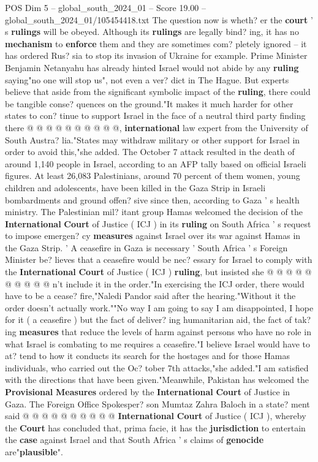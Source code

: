 \begin{textsample}{POS Dim 5 – global\_south\_2024\_01 – Score 19.00 – global\_south\_2024\_01/105454418.txt}
The question now is wheth? er the \textbf{court} ' s \textbf{rulings} will be obeyed.
Although its \textbf{rulings} are legally bind? ing, it has no \textbf{mechanism} to \textbf{enforce} them and they are sometimes com? pletely ignored -- it has ordered Rus? sia to stop its invasion of Ukraine for example.
Prime Minister Benjamin Netanyahu has already hinted Israel would not abide by any \textbf{ruling} saying"no one will stop us", not even a ver? dict in The Hague.
But experts believe that aside from the significant symbolic impact of the \textbf{ruling}, there could be tangible conse? quences on the ground."It makes it much harder for other states to con? tinue to support Israel in the face of a neutral third party finding there @ @ @ @ @ @ @ @ @ @, \textbf{international} law expert from the University of South Austra? lia."States may withdraw military or other support for Israel in order to avoid this,"she added.
The October 7 attack resulted in the death of around 1,140 people in Israel, according to an AFP tally based on official Israeli figures.
At least 26,083 Palestinians, around 70 percent of them women, young children and adolescents, have been killed in the Gaza Strip in Israeli bombardments and ground offen? sive since then, according to Gaza ' s health ministry.
The Palestinian mil? itant group Hamas welcomed the decision of the \textbf{International} \textbf{Court} of Justice ( ICJ ) in its \textbf{ruling} on South Africa ' s request to impose emergen? cy \textbf{measures} against Israel over its war against Hamas in the Gaza Strip. ' A ceasefire in Gaza is necessary ' South Africa ' s Foreign Minister be? lieves that a ceasefire would be nec? essary for Israel to comply with the \textbf{International} \textbf{Court} of Justice ( ICJ ) \textbf{ruling}, but insisted she @ @ @ @ @ @ @ @ @ @ n't include it in the order."In exercising the ICJ order, there would have to be a cease? fire,"Naledi Pandor said after the hearing."Without it the order doesn't actually work.""No way I am going to say I am disappointed, I hope for it ( a ceasefire ) but the fact of deliver? ing humanitarian aid, the fact of tak? ing \textbf{measures} that reduce the levels of harm against persons who have no role in what Israel is combating to me requires a ceasefire."I believe Israel would have to at? tend to how it conducts its search for the hostages and for those Hamas individuals, who carried out the Oc? tober 7th attacks,"she added."I am satisfied with the directions that have been given."Meanwhile, Pakistan has welcomed the \textbf{Provisional} \textbf{Measures} ordered by the \textbf{International} \textbf{Court} of Justice in Gaza.
The Foreign Office Spokesper? son Mumtaz Zahra Baloch in a state? ment said @ @ @ @ @ @ @ @ @ @ \textbf{International} \textbf{Court} of Justice ( ICJ ), whereby the \textbf{Court} has concluded that, prima facie, it has the \textbf{jurisdiction} to entertain the \textbf{case} against Israel and that South Africa ' s claims of \textbf{genocide} are"\textbf{plausible}".


\end{textsample}
